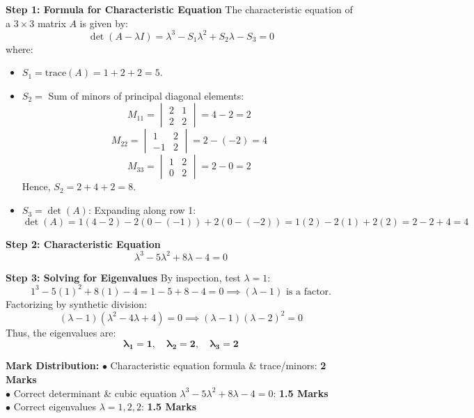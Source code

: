\begin{solutionbox}
\textbf{Step 1: Formula for Characteristic Equation}
The characteristic equation of a $3\times 3$ matrix $A$ is given by:
\[
\det(A - \lambda I) = \lambda^3 - S_1 \lambda^2 + S_2 \lambda - S_3 = 0
\]
where:
\begin{itemize}[leftmargin=6mm]
    \item $S_1 = \text{trace}(A) = 1 + 2 + 2 = 5$.
    \item $S_2 =$ Sum of minors of principal diagonal elements:
    \[
    M_{11} = \begin{vmatrix} 2 & 1 \\ 2 & 2 \end{vmatrix} = 4 - 2 = 2
    \]
    \[
    M_{22} = \begin{vmatrix} 1 & 2 \\ -1 & 2 \end{vmatrix} = 2 - (-2) = 4
    \]
    \[
    M_{33} = \begin{vmatrix} 1 & 2 \\ 0 & 2 \end{vmatrix} = 2 - 0 = 2
    \]
    Hence, $S_2 = 2 + 4 + 2 = 8$.
    \item $S_3 = \det(A)$: Expanding along row 1:
    \[
    \det(A) = 1(4 - 2) - 2(0 - (-1)) + 2(0 - (-2)) = 1(2) - 2(1) + 2(2) = 2 - 2 + 4 = 4
    \]
\end{itemize}

\textbf{Step 2: Characteristic Equation}
\[
\lambda^3 - 5\lambda^2 + 8\lambda - 4 = 0
\]

\textbf{Step 3: Solving for Eigenvalues}
By inspection, test $\lambda = 1$:
\[
1^3 - 5(1)^2 + 8(1) - 4 = 1 - 5 + 8 - 4 = 0 \implies (\lambda - 1) \text{ is a factor.}
\]
Factorizing by synthetic division:
\[
(\lambda - 1)(\lambda^2 - 4\lambda + 4) = 0 \implies (\lambda - 1)(\lambda - 2)^2 = 0
\]
Thus, the eigenvalues are:
\[
\mathbf{\lambda_1 = 1, \quad \lambda_2 = 2, \quad \lambda_3 = 2}
\]

\begin{markingrubric}
\textbf{Mark Distribution:}
$\bullet$ Characteristic equation formula \& trace/minors: \textbf{2 Marks}\\
$\bullet$ Correct determinant \& cubic equation $\lambda^3 - 5\lambda^2 + 8\lambda - 4 = 0$: \textbf{1.5 Marks}\\
$\bullet$ Correct eigenvalues $\lambda = 1, 2, 2$: \textbf{1.5 Marks}
\end{markingrubric}
\end{solutionbox}

